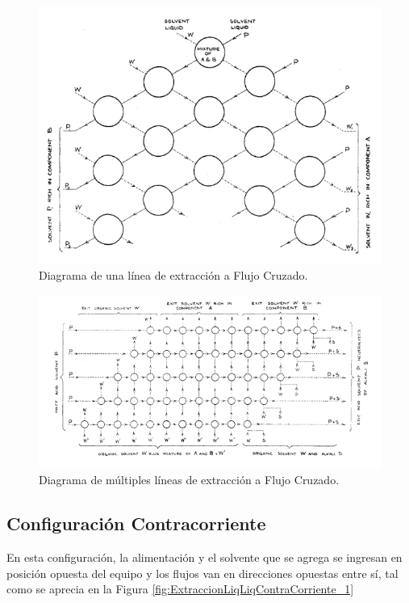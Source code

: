 \documentclass[11pt]{book}
\begin{document}
\begin{figure}[H]
    \centering
    \includegraphics{img/LiquidoLiquido/ExtracionLiqLiqCruzado_5.PNG}
    \caption{Diagrama de una línea de extracción a Flujo Cruzado.}
    \label{fig:ExtraccionLiqLiqCruzado_5}
\end{figure}

\begin{figure}[H]
    \centering
    \includegraphics{img/LiquidoLiquido/ExtracionLiqLiqCruzado_6.PNG}
    \caption{Diagrama de múltiples líneas de extracción a Flujo Cruzado.}
    \label{fig:ExtraccionLiqLiqCruzado_6}
\end{figure}

\subsection{Configuración Contracorriente}

En esta configuración, la alimentación y el solvente que se agrega se ingresan en posición opuesta del equipo y los flujos van en direcciones opuestas entre sí, tal como se aprecia en la Figura \ref{fig:ExtraccionLiqLiqContraCorriente_1}
\end{document}
